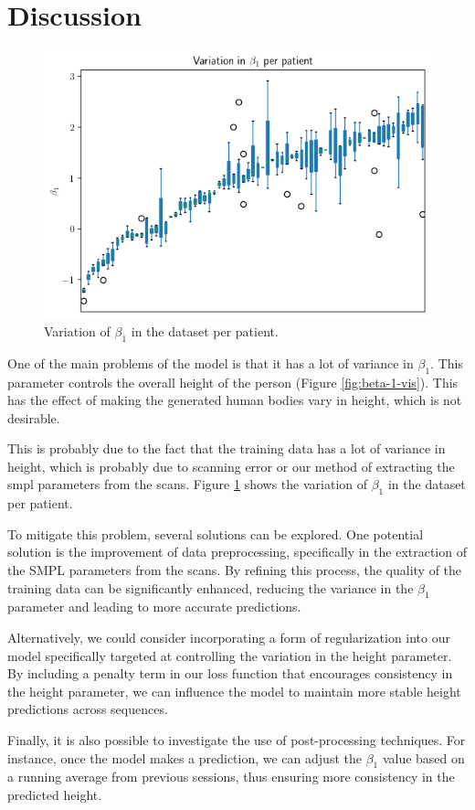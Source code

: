 \section{Discussion}

\begin{figure}[h]
    \centering
    \includegraphics{files/beta_1_var.png}
    \caption{Variation of $\beta_1$ in the dataset per patient.}
    \label{fig:beta-var}
\end{figure}

One of the main problems of the model is that it has a lot of variance in
$\beta_1$. This parameter controls the overall height of the person (Figure
\ref{fig:beta-1-vis}). This has the effect of making the generated human bodies
vary in height, which is not desirable.

This is probably due to the fact that the training data has a lot of variance
in height, which is probably due to scanning error or our method of extracting
the \gls{smpl} parameters from the scans. Figure \ref{fig:beta-var} shows the
variation of $\beta_1$ in the dataset per patient.

To mitigate this problem, several solutions can be explored. One potential
solution is the improvement of data preprocessing, specifically in the
extraction of the SMPL parameters from the scans. By refining this process, the
quality of the training data can be significantly enhanced, reducing the
variance in the $\beta_1$ parameter and leading to more accurate predictions.

Alternatively, we could consider incorporating a form of regularization into
our model specifically targeted at controlling the variation in the height
parameter. By including a penalty term in our loss function that encourages
consistency in the height parameter, we can influence the model to maintain
more stable height predictions across sequences.

Finally, it is also possible to investigate the use of post-processing
techniques. For instance, once the model makes a prediction, we can adjust the
$\beta_1$ value based on a running average from previous sessions, thus
ensuring more consistency in the predicted height.